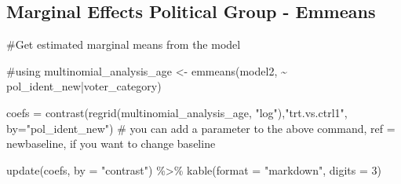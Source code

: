 \documentclass[
  letterpaper,
  DIV=11,
  numbers=noendperiod]{scrartcl}
\newenvironment{Shaded}{\begin{snugshade}}{\end{snugshade}}
\newcommand{\AttributeTok}[1]{\textcolor[rgb]{0.40,0.45,0.13}{#1}}
\newcommand{\CommentTok}[1]{\textcolor[rgb]{0.37,0.37,0.37}{#1}}
\newcommand{\DecValTok}[1]{\textcolor[rgb]{0.68,0.00,0.00}{#1}}
\newcommand{\FunctionTok}[1]{\textcolor[rgb]{0.28,0.35,0.67}{#1}}
\newcommand{\NormalTok}[1]{\textcolor[rgb]{0.00,0.23,0.31}{#1}}
\newcommand{\OtherTok}[1]{\textcolor[rgb]{0.00,0.23,0.31}{#1}}
\newcommand{\SpecialCharTok}[1]{\textcolor[rgb]{0.37,0.37,0.37}{#1}}
\newcommand{\StringTok}[1]{\textcolor[rgb]{0.13,0.47,0.30}{#1}}
\begin{document}
\subsection{Marginal Effects Political Group -
Emmeans}\label{marginal-effects-political-group---emmeans}

\begin{Shaded}
\begin{Highlighting}[]
\CommentTok{\#Get estimated marginal means from the model}

\CommentTok{\#using }
\NormalTok{multinomial\_analysis\_age }\OtherTok{\textless{}{-}} \FunctionTok{emmeans}\NormalTok{(model2, }\SpecialCharTok{\textasciitilde{}}\NormalTok{ pol\_ident\_new}\SpecialCharTok{|}\NormalTok{voter\_category)}


\NormalTok{coefs }\OtherTok{=} \FunctionTok{contrast}\NormalTok{(}\FunctionTok{regrid}\NormalTok{(multinomial\_analysis\_age, }\StringTok{"log"}\NormalTok{),}\StringTok{"trt.vs.ctrl1"}\NormalTok{,  }\AttributeTok{by=}\StringTok{"pol\_ident\_new"}\NormalTok{)}
\CommentTok{\# you can add a parameter to the above command, ref = newbaseline, if you want to change baseline}

\FunctionTok{update}\NormalTok{(coefs, }\AttributeTok{by =} \StringTok{"contrast"}\NormalTok{) }\SpecialCharTok{\%\textgreater{}\%} 
  \FunctionTok{kable}\NormalTok{(}\AttributeTok{format =} \StringTok{"markdown"}\NormalTok{, }\AttributeTok{digits =} \DecValTok{3}\NormalTok{)}
\end{Highlighting}
\end{Shaded}
\end{document}
